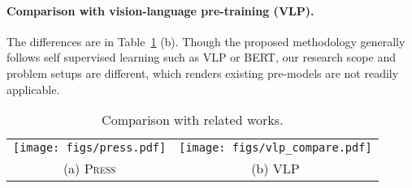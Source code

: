 \documentclass[10pt,twocolumn,letterpaper]{article}
\begin{document}
\vspace{-0mm}
\paragraph{Comparison with vision-language pre-training (VLP).} 
The differences are in Table~\ref{tab:comparison} (b). Though the proposed methodology generally follows self supervised learning such as VLP or BERT, our research scope and problem setups are different, which renders existing pre-models are not readily applicable.

\begin{table}[h!]\centering \hspace{-2.5mm}
	\begin{minipage}{1.0\linewidth}
		\vskip 0.0in
		\centering
		\begin{tabular}{cc}
        \texttt{[image: figs/press.pdf]}
        & 
        \texttt{[image: figs/vlp\_compare.pdf]}
	   \\
	   (a) \textsc{Press} &  (b) VLP
	  	\end{tabular}
	\end{minipage}
	\vspace{-3mm}
\caption{Comparison with related works.} 
	\label{tab:comparison}
\end{table}
\end{document}
